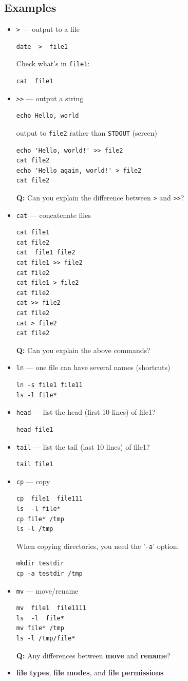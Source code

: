 \documentclass[12pt]{article}
\begin{document}
\subsection{Examples}
\label{sec-1-4}
\begin{itemize}
\item \texttt{>} --- output to a file
\begin{verbatim}
date  >  file1
\end{verbatim}
Check what's in \texttt{file1}:
\begin{verbatim}
cat  file1
\end{verbatim}
\item \texttt{>>} --- output a string
\begin{verbatim}
echo Hello, world
\end{verbatim}
output to \texttt{file2} rather than \texttt{STDOUT} (screen)
\begin{verbatim}
echo 'Hello, world!' >> file2
cat file2
echo 'Hello again, world!' > file2
cat file2
\end{verbatim}
\textbf{Q:} Can you explain the difference between \texttt{>} and \texttt{>>}?
\item \texttt{cat} --- concatenate files
\begin{verbatim}
cat file1
cat file2
cat  file1 file2
cat file1 >> file2
cat file2
cat file1 > file2
cat file2
cat >> file2
cat file2
cat > file2
cat file2
\end{verbatim}
\textbf{Q:} Can you explain the above commands?
\item \texttt{ln} --- one file can have several names (shortcuts)
\begin{verbatim}
ln -s file1 file11
ls -l file*
\end{verbatim}
\item \texttt{head} --- list the head (first 10 lines) of file1?
\begin{verbatim}
head file1
\end{verbatim}
\item \texttt{tail} --- list the tail (last 10 lines) of file1?
\begin{verbatim}
tail file1
\end{verbatim}
\item \texttt{cp} --- copy
\begin{verbatim}
cp  file1  file111
ls  -l file*
cp file* /tmp
ls -l /tmp
\end{verbatim}
When copying directories, you need the '\texttt{-a}' option:
\begin{verbatim}
mkdir testdir
cp -a testdir /tmp
\end{verbatim}
\item \texttt{mv} --- move/rename
\begin{verbatim}
mv  file1  file1111
ls  -l  file*
mv file* /tmp
ls -l /tmp/file*
\end{verbatim}
\textbf{Q:} Any differences between \textbf{move} and \textbf{rename}?
\item \textbf{file types}, \textbf{file modes}, and \textbf{file permissions}


\end{itemize}
\end{document}
